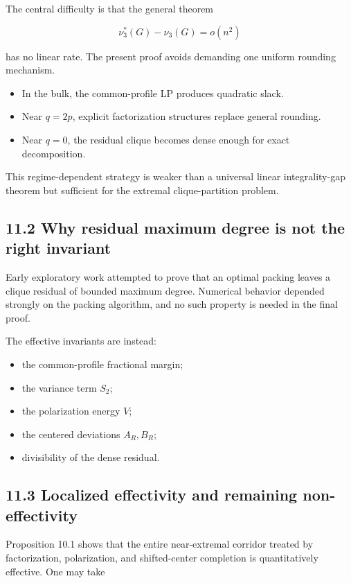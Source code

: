 \documentclass[11pt,a4paper]{article}
\providecommand{\tightlist}{\setlength{\itemsep}{0pt}\setlength{\parskip}{0pt}}
\begin{document}
The central difficulty is that the general theorem

\[
\nu_3^*(G)-\nu_3(G)=o(n^2)
\]

has no linear rate. The present proof avoids demanding one uniform rounding mechanism.

\begin{itemize}
\tightlist
\item
  In the bulk, the common-profile LP produces quadratic slack.
\item
  Near \(q=2p\), explicit factorization structures replace general rounding.
\item
  Near \(q=0\), the residual clique becomes dense enough for exact decomposition.
\end{itemize}

This regime-dependent strategy is weaker than a universal linear integrality-gap theorem but sufficient for the extremal clique-partition problem.

\subsection{11.2 Why residual maximum degree is not the right invariant}\label{why-residual-maximum-degree-is-not-the-right-invariant}

Early exploratory work attempted to prove that an optimal packing leaves a clique residual of bounded maximum degree. Numerical behavior depended strongly on the packing algorithm, and no such property is needed in the final proof.

The effective invariants are instead:

\begin{itemize}
\tightlist
\item
  the common-profile fractional margin;
\item
  the variance term \(S_2\);
\item
  the polarization energy \(V\);
\item
  the centered deviations \(A_R,B_R\);
\item
  divisibility of the dense residual.
\end{itemize}

\subsection{11.3 Localized effectivity and remaining non-effectivity}\label{localized-effectivity-and-remaining-non-effectivity}

Proposition 10.1 shows that the entire near-extremal corridor treated by factorization, polarization, and shifted-center completion is quantitatively effective. One may take
\end{document}
